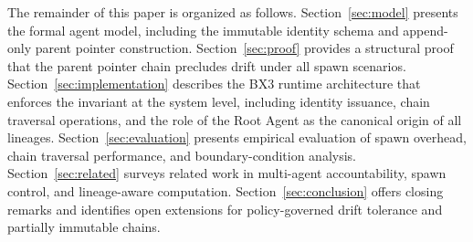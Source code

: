 The remainder of this paper is organized as follows. Section~\ref{sec:model} presents the formal agent model, including the immutable identity schema and append-only parent pointer construction. Section~\ref{sec:proof} provides a structural proof that the parent pointer chain precludes drift under all spawn scenarios. Section~\ref{sec:implementation} describes the BX3 runtime architecture that enforces the \PPC invariant at the system level, including identity issuance, chain traversal operations, and the role of the Root Agent as the canonical origin of all lineages. Section~\ref{sec:evaluation} presents empirical evaluation of spawn overhead, chain traversal performance, and boundary-condition analysis. Section~\ref{sec:related} surveys related work in multi-agent accountability, spawn control, and lineage-aware computation. Section~\ref{sec:conclusion} offers closing remarks and identifies open extensions for policy-governed drift tolerance and partially immutable chains.